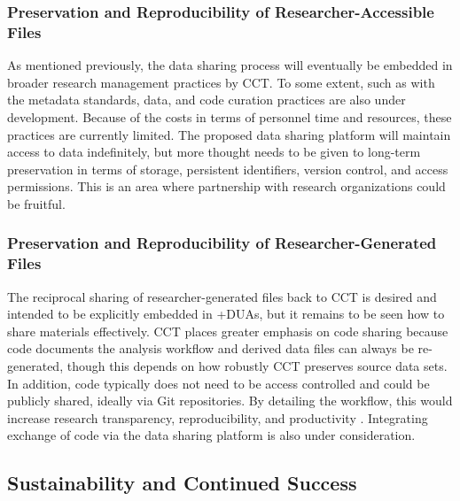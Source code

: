 \documentclass[
]{WileySix}
\begin{document}
\hypertarget{preservation-and-reproducibility-of-researcher-accessible-files-5}{%
\subsubsection{Preservation and Reproducibility of Researcher-Accessible Files}\label{preservation-and-reproducibility-of-researcher-accessible-files-5}}

As mentioned previously, the data sharing process will eventually be embedded in broader research management practices by CCT. To some extent, such as with the metadata standards, data, and code curation practices are also under development. Because of the costs in terms of personnel time and resources, these practices are currently limited. The proposed data sharing platform will maintain access to data indefinitely, but more thought needs to be given to long-term preservation in terms of storage, persistent identifiers, version control, and access permissions. This is an area where partnership with research organizations could be fruitful.

\hypertarget{preservation-and-reproducibility-of-researcher-generated-files-4}{%
\subsubsection{Preservation and Reproducibility of Researcher-Generated Files}\label{preservation-and-reproducibility-of-researcher-generated-files-4}}

The reciprocal sharing of researcher-generated files back to CCT is desired and intended to be explicitly embedded in +DUAs\textbar, but it remains to be seen how to share materials effectively. CCT places greater emphasis on code sharing because code documents the analysis workflow and derived data files can always be re-generated, though this depends on how robustly CCT preserves source data sets. In addition, code typically does not need to be access controlled and could be publicly shared, ideally via Git repositories. By detailing the workflow, this would increase research transparency, reproducibility, and productivity \citep{playford2016}. Integrating exchange of code via the data sharing platform is also under consideration.

\hypertarget{sustainability-and-continued-success-6}{%
\subsection{Sustainability and Continued Success}\label{sustainability-and-continued-success-6}}
\end{document}
